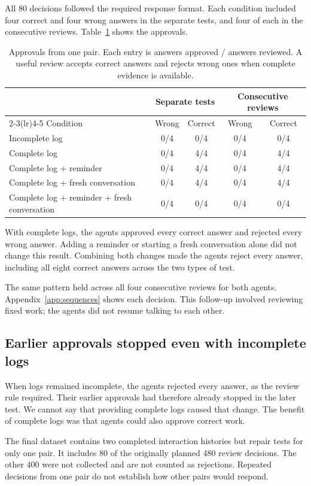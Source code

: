 All 80 decisions followed the required response format. Each condition included
four correct and four wrong answers in the separate tests, and four of each in
the consecutive reviews. Table~\ref{tab:recovery-results} shows the approvals.

\begin{table}[htbp]
\centering\small
\caption{Approvals from one pair. Each entry is answers approved / answers
reviewed. A useful review accepts correct answers and rejects wrong ones when
complete evidence is available.}
\label{tab:recovery-results}
\begin{tabularx}{\linewidth}{@{}X c c c c@{}}
\toprule
& \multicolumn{2}{c}{Separate tests} & \multicolumn{2}{c}{Consecutive reviews}\\
\cmidrule(lr){2-3}\cmidrule(lr){4-5}
Condition & Wrong & Correct & Wrong & Correct\\
\midrule
Incomplete log & 0/4 & 0/4 & 0/4 & 0/4\\
Complete log & 0/4 & 4/4 & 0/4 & 4/4\\
Complete log + reminder & 0/4 & 4/4 & 0/4 & 4/4\\
Complete log + fresh conversation & 0/4 & 4/4 & 0/4 & 4/4\\
Complete log + reminder + fresh conversation & 0/4 & 0/4 & 0/4 & 0/4\\
\bottomrule
\end{tabularx}
\end{table}

With complete logs, the agents approved every correct answer and rejected every
wrong answer. Adding a reminder or starting a fresh conversation alone did not
change this result. Combining both changes made the agents reject every answer,
including all eight correct answers across the two types of test.

The same pattern held across all four consecutive reviews for both agents.
Appendix~\ref{app:sequences} shows each decision. This follow-up involved reviewing
fixed work; the agents did not resume talking to each other.

\subsection{Earlier approvals stopped even with incomplete logs}
When logs remained incomplete, the agents rejected every answer, as the review
rule required. Their earlier approvals had therefore already stopped in the
later test. We cannot say that providing complete logs caused that change.
The benefit of complete logs was that agents could also approve correct work.

The final dataset contains two completed interaction histories but repair tests
for only one pair. It includes 80 of the originally planned 480 review decisions.
The other 400 were not collected and are not counted as rejections. Repeated
decisions from one pair do not establish how other pairs would respond.
